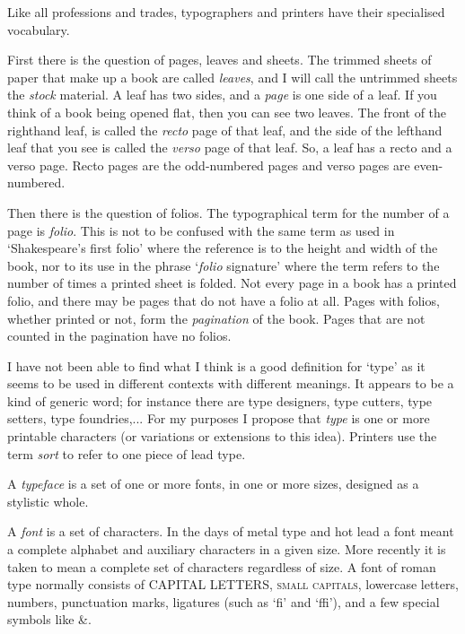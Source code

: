 \documentclass[10pt,a4paper,oneside,extrafontsizes]{memoir}%
\begin{document}
\begin{paracol}{2}
\switchEng
    Like all professions and trades, typographers and printers have their
specialised vocabulary.

First there is the question of pages, leaves and sheets.  The trimmed
sheets of paper that make up a book are called
\emph{leaves}, and I will call the untrimmed sheets the
\emph{stock} material.  A leaf has two sides, and a
\emph{page} is one side of a leaf.  If you think of a book
being opened flat, then you can see two leaves. The front of the
righthand leaf, is called the \emph{recto} page of that
leaf, and the side of the lefthand leaf that you see is called the
\emph{verso} page of that leaf.  So, a leaf has a recto
and a verso page. Recto pages are the odd-numbered pages and verso
pages are even-numbered.

   Then there is the question of folios. The typographical term for
the number of a page is \emph{folio}.
This is not to be confused with
the same term as used in `Shakespeare's first folio' where the reference is
to the height and width of the book, nor to its use in the phrase
`\emph{folio} signature' where the term refers to the 
number of times a printed sheet is folded. 
Not every page in a book has a printed
folio, and there may be pages that do not have a folio at all. Pages with
folios, whether printed or not, form the \emph{pagination} 
of the book. Pages
that are not counted in the pagination have no folios.

 I have not been able to find what I think is a good
definition for `type' as it seems to be used in different contexts with
different meanings. It appears to be a kind of generic word; for instance
there are type designers, type cutters, type setters, type foundries,...
For my purposes I propose that \emph{type} is 
one or more printable characters (or variations or extensions to this idea).  
Printers use the term \emph{sort} to refer to one piece of lead
type.

   A \emph{typeface} is a set of one or more fonts, in one
or more sizes, designed as a stylistic whole. 

   A \emph{font} is a set of characters. In the days of 
metal type and hot lead a font meant a complete alphabet and auxiliary
characters in a given size. More recently it is taken to mean a complete
set of characters regardless of size. A font of roman type normally
consists of CAPITAL LETTERS, \textsc{small capitals}, lowercase letters,
numbers, punctuation marks, ligatures (such as `fi' and `ffi'), and a
few special symbols like \&.


\end{paracol}
\end{document}
